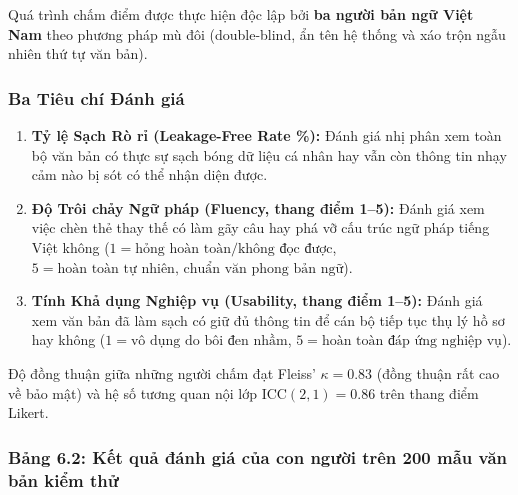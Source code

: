\documentclass[
  11pt,
  a4paper,
]{article}
\providecommand{\tightlist}{%
  \setlength{\itemsep}{0pt}\setlength{\parskip}{0pt}}
\begin{document}
Quá trình chấm điểm được thực hiện độc lập bởi \textbf{ba người bản ngữ Việt Nam} theo phương pháp
mù đôi (double-blind, ẩn tên hệ thống và xáo trộn ngẫu nhiên thứ tự văn bản).

\subsubsection{Ba Tiêu chí Đánh giá}\label{ba-tiuxeau-chuxed-ux111uxe1nh-giuxe1}

\begin{enumerate}
\def\labelenumi{\arabic{enumi}.}
\tightlist
\item
  \textbf{Tỷ lệ Sạch Rò rỉ (Leakage-Free Rate \%):} Đánh giá nhị phân xem toàn bộ văn bản có thực sự
  sạch bóng dữ liệu cá nhân hay vẫn còn thông tin nhạy cảm nào bị sót có thể nhận diện được.
\item
  \textbf{Độ Trôi chảy Ngữ pháp (Fluency, thang điểm 1--5):} Đánh giá xem việc chèn thẻ thay thế có
  làm gãy câu hay phá vỡ cấu trúc ngữ pháp tiếng Việt không
  (\(1 = \text{hỏng hoàn toàn/không đọc được}\),
  \(5 = \text{hoàn toàn tự nhiên, chuẩn văn phong bản ngữ}\)).
\item
  \textbf{Tính Khả dụng Nghiệp vụ (Usability, thang điểm 1--5):} Đánh giá xem văn bản đã làm sạch có
  giữ đủ thông tin để cán bộ tiếp tục thụ lý hồ sơ hay không
  (\(1 = \text{vô dụng do bôi đen nhầm}\), \(5 = \text{hoàn toàn đáp ứng nghiệp vụ}\)).
\end{enumerate}

Độ đồng thuận giữa những người chấm đạt Fleiss' \(\kappa = 0.83\) (đồng thuận rất cao về bảo mật) và
hệ số tương quan nội lớp \(\text{ICC}(2,1) = 0.86\) trên thang điểm Likert.

\subsubsection{Bảng 6.2: Kết quả đánh giá của con người trên 200 mẫu văn bản kiểm
thử}\label{bux1ea3ng-6.2-kux1ebft-quux1ea3-ux111uxe1nh-giuxe1-cux1ee7a-con-ngux1b0ux1eddi-truxean-200-mux1eabu-vux103n-bux1ea3n-kiux1ec3m-thux1eed}
\end{document}
